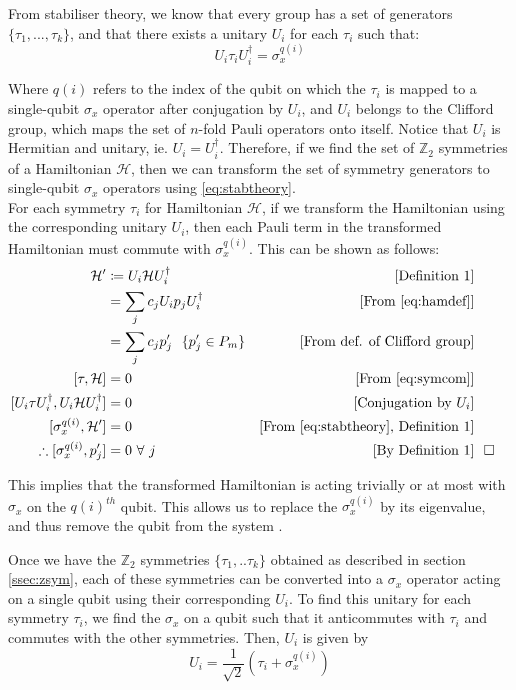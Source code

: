 \documentclass{article}
\newcommand{\qed}{\hfill\square}
\newcommand{\ham}{\mathcal{H}}
\newcommand{\zsym}{\mathbb{Z}_2}
\renewcommand{\th}[1]{#1^{th}}
\begin{document}
From stabiliser theory, we know that every group has a set of generators $\{\tau_1, ..., \tau_k\}$, and that there exists a unitary $U_i$ for each $\tau_i$ such that\cite{setiaReducingQubitRequirements2020}:
\begin{equation}\label{eq:stabtheory}
    U_i\tau_iU_i^\dagger = \sigma_x^{q(i)}
\end{equation}

Where $q(i)$ refers to the index of the qubit on which the $\tau_i$ is mapped to a single-qubit $\sigma_x$ operator after conjugation by $U_i$, and $U_i$ belongs to the Clifford group, which maps the set of $n$-fold Pauli operators onto itself. Notice that $U_i$ is Hermitian and unitary, ie. $U_i= U_i^{\dagger}$. Therefore, if we find the set of $\zsym$ symmetries of a Hamiltonian $\ham$, then we can transform the set of symmetry generators to single-qubit $\sigma_x$ operators using \eqref{eq:stabtheory}.\\
For each symmetry $\tau_i$ for Hamiltonian $\ham$, if we transform the Hamiltonian using the corresponding unitary $U_i$, then each Pauli term in the transformed Hamiltonian must commute with $\sigma_x^{q(i)}$. This can be shown as follows:\\
\begin{align*}
    \ham ' &\coloneq  U_i \ham U_i^\dagger &[\text{Definition 1}]\\
    &= \sum_j c_j U_i p_j U_i^\dagger &[\text{From \eqref{eq:hamdef}}]\\
    &= \sum_j c_j p'_j ~~\{p'_j \in P_m\}&[\text{From def. of Clifford group}]\\
    [\tau, \ham]&=0 &[\text{From \eqref{eq:symcom}}]\\
    [U_i\tau U_i^\dagger, U_i\ham U_i^\dagger]&=0  &[\text{Conjugation by $U_i$}]\\
    [\sigma_x^{q(i)}, \ham'] &= 0 &[\text{From \eqref{eq:stabtheory}, Definition 1}]\\
    \therefore [\sigma_x^{q(i)}, p'_j] &= 0 ~\forall ~j&\text{[By Definition 1]}&~~\qed
\end{align*}

This implies that the transformed Hamiltonian is acting trivially or at most with $\sigma_x$ on the $\th{q(i)}$ qubit. This allows us to replace the $\sigma_x^{q(i)}$ by its eigenvalue, and thus remove the qubit from the system \cite{setiaReducingQubitRequirements2020}.

Once we have the $\zsym$ symmetries $\{\tau_1, .. \tau_k\}$ obtained as described in section \ref{ssec:zsym}, each of these symmetries can be converted into a $\sigma_x$ operator acting on a single qubit using their corresponding $U_i$. To find this unitary for each symmetry $\tau_i$, we find the $\sigma_x$ on a qubit such that it anticommutes with $\tau_i$ and commutes with the other symmetries. Then, $U_i$ is given by\cite{setiaReducingQubitRequirements2020} \begin{equation}\label{eq:taperunit}
    U_i =\frac{1}{\sqrt2}\left(\tau_i + \sigma_x^{q(i)}\right)
\end{equation}
\end{document}

